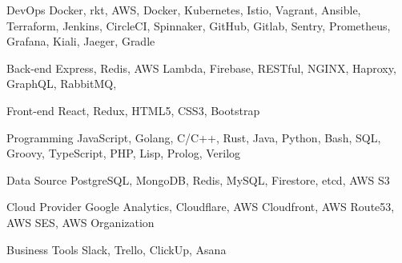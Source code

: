 

\begin{cvskills}

  \cvskill
    {DevOps} %
    {Docker, rkt, AWS, Docker, Kubernetes, Istio, Vagrant, Ansible, Terraform, Jenkins, CircleCI, Spinnaker, GitHub, Gitlab, Sentry, Prometheus, Grafana, Kiali, Jaeger, Gradle} %

  \cvskill
    {Back-end} %
    {Express, Redis, AWS Lambda, Firebase, RESTful, NGINX, Haproxy, GraphQL, RabbitMQ, } %

  \cvskill
    {Front-end} %
    {React, Redux, HTML5, CSS3, Bootstrap} %

  \cvskill
    {Programming} %
    {JavaScript, Golang, C/C++, Rust, Java, Python, Bash, SQL, Groovy, TypeScript, PHP, Lisp, Prolog, Verilog} %

  \cvskill
    {Data Source} %
    {PostgreSQL, MongoDB, Redis, MySQL, Firestore, etcd, AWS S3} %

  \cvskill
    {Cloud Provider} %
    {Google Analytics, Cloudflare, AWS Cloudfront, AWS Route53, AWS SES, AWS Organization} %

  \cvskill
    {Business Tools} %
    {Slack, Trello, ClickUp, Asana} %

\end{cvskills}
